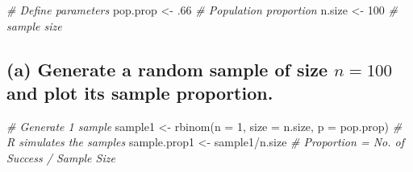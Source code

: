 \documentclass[
]{book}
\newenvironment{Shaded}{\begin{snugshade}}{\end{snugshade}}
\newcommand{\AttributeTok}[1]{\textcolor[rgb]{0.77,0.63,0.00}{#1}}
\newcommand{\CommentTok}[1]{\textcolor[rgb]{0.56,0.35,0.01}{\textit{#1}}}
\newcommand{\DecValTok}[1]{\textcolor[rgb]{0.00,0.00,0.81}{#1}}
\newcommand{\FunctionTok}[1]{\textcolor[rgb]{0.00,0.00,0.00}{#1}}
\newcommand{\NormalTok}[1]{#1}
\newcommand{\OtherTok}[1]{\textcolor[rgb]{0.56,0.35,0.01}{#1}}
\newcommand{\SpecialCharTok}[1]{\textcolor[rgb]{0.00,0.00,0.00}{#1}}
\begin{document}
\begin{Shaded}
\begin{Highlighting}[]
\CommentTok{\# Define parameters}
\NormalTok{pop.prop }\OtherTok{\textless{}{-}}\NormalTok{ .}\DecValTok{66} \CommentTok{\# Population proportion}
\NormalTok{n.size }\OtherTok{\textless{}{-}} \DecValTok{100}  \CommentTok{\# sample size}
\end{Highlighting}
\end{Shaded}

\hypertarget{a-generate-a-random-sample-of-size-n-100-and-plot-its-sample-proportion.}{%
\subsection{\texorpdfstring{(a) Generate a random sample of size \(n= 100\) and plot its sample proportion.}{(a) Generate a random sample of size n= 100 and plot its sample proportion.}}\label{a-generate-a-random-sample-of-size-n-100-and-plot-its-sample-proportion.}}

\begin{Shaded}
\begin{Highlighting}[]
\CommentTok{\# Generate 1 sample}
\NormalTok{sample1 }\OtherTok{\textless{}{-}} \FunctionTok{rbinom}\NormalTok{(}\AttributeTok{n =} \DecValTok{1}\NormalTok{, }\AttributeTok{size =}\NormalTok{ n.size, }\AttributeTok{p =}\NormalTok{ pop.prop) }\CommentTok{\# R simulates the samples}
\NormalTok{sample.prop1 }\OtherTok{\textless{}{-}}\NormalTok{ sample1}\SpecialCharTok{/}\NormalTok{n.size }\CommentTok{\#  Proportion = No. of Success / Sample Size}
\end{Highlighting}
\end{Shaded}
\end{document}
